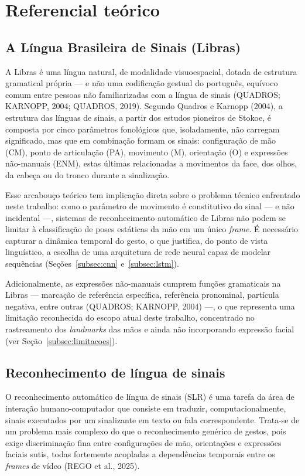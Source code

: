 \section{Referencial teórico}

\subsection{A Língua Brasileira de Sinais (Libras)}

A Libras é uma língua natural, de modalidade visuoespacial, dotada de estrutura
gramatical própria — e não uma codificação gestual do português, equívoco comum
entre pessoas não familiarizadas com a língua de sinais (QUADROS; KARNOPP, 2004;
QUADROS, 2019). Segundo Quadros e Karnopp (2004), a estrutura das línguas de
sinais, a partir dos estudos pioneiros de Stokoe, é composta por cinco parâmetros
fonológicos que, isoladamente, não carregam significado, mas que em combinação
formam os sinais: configuração de mão (CM), ponto de articulação (PA), movimento
(M), orientação (O) e expressões não-manuais (ENM), estas últimas relacionadas a
movimentos da face, dos olhos, da cabeça ou do tronco durante a sinalização.

Esse arcabouço teórico tem implicação direta sobre o problema técnico enfrentado
neste trabalho: como o parâmetro de movimento é constitutivo do sinal — e não
incidental —, sistemas de reconhecimento automático de Libras não podem se
limitar à classificação de poses estáticas da mão em um único \textit{frame}. É
necessário capturar a dinâmica temporal do gesto, o que justifica, do ponto de
vista linguístico, a escolha de uma arquitetura de rede neural capaz de modelar
sequências (Seções~\ref{subsec:cnn} e~\ref{subsec:lstm}).

Adicionalmente, as expressões não-manuais cumprem funções gramaticais na Libras —
marcação de referência específica, referência pronominal, partícula negativa,
entre outras (QUADROS; KARNOPP, 2004) —, o que representa uma limitação
reconhecida do escopo atual deste trabalho, concentrado no rastreamento dos
\textit{landmarks} das mãos e ainda não incorporando expressão facial (ver
Seção~\ref{subsec:limitacoes}).

\subsection{Reconhecimento de língua de sinais}

O reconhecimento automático de língua de sinais (SLR) é uma tarefa da área de
interação humano-computador que consiste em traduzir, computacionalmente, sinais
executados por um sinalizante em texto ou fala correspondente. Trata-se de um
problema mais complexo do que o reconhecimento genérico de gestos, pois exige
discriminação fina entre configurações de mão, orientações e expressões faciais
sutis, todas fortemente acopladas a dependências temporais entre os
\textit{frames} de vídeo (REGO et al., 2025).

